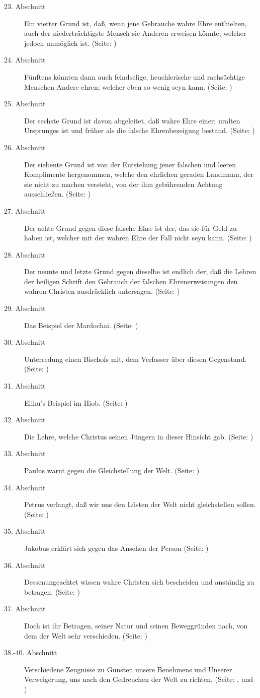 \begin{description}
\item[23. Abschnitt] Ein vierter Grund ist, daß, wenn jene Gebrauche wahre Ehre
enthielten, auch der niederträchtigste Mensch sie Anderen erweisen könnte;
welcher jedoch unmöglich ist. (Seite: \pageref{kap9_ab23})
\item[24. Abschnitt] Fünftens könnten dann auch feindselige, heuchlerische und
rachsüchtige Menschen Andere ehren; welcher eben so wenig seyn kann. (Seite: \pageref{kap9_ab24})
\item[25. Abschnitt] Der sechste Grund ist davon abgeleitet, daß wahre Ehre
einer; uralten Ursprunges ist und früher als die falsche Ehrenbezeigung bestand. (Seite: \pageref{kap9_ab25})
\item[26. Abschnitt] Der siebente Grund ist von der Entstehung jener falschen
und leeren Komplimente hergenommen, welche den ehrlichen geraden Landmann, der
sie nicht zu machen versteht, von der ihm gebührenden Achtung ausschließen. (Seite: \pageref{kap9_ab26})
\item[27. Abschnitt] Der achte Grund gegen diese falsche Ehre ist der, das sie
für Geld zu haben ist, welcher mit der wahren Ehre der Fall nicht seyn kann. (Seite: \pageref{kap9_ab27})
\item[28. Abschnitt] Der neunte und letzte Grund gegen dieselbe ist endlich der,
daß die Lehren der heiligen Schrift den Gebrauch der falschen Ehrenerweisungen
den wahren Christen ausdrücklich untersagen. (Seite: \pageref{kap9_ab28})
\item[29. Abschnitt] Das Beispiel der Mardochai. (Seite: \pageref{kap9_ab29})
\item[30. Abschnitt] Unterredung einen Bischofs mit, dem Verfasser über diesen
Gegenstand. (Seite: \pageref{kap9_ab30})
\item[31. Abschnitt] Elihu's Beispiel im Hiob. (Seite: \pageref{kap9_ab31})
\item[32. Abschnitt] Die Lehre, welche Christus seinen Jüngern in dieser
Hinsicht gab. (Seite: \pageref{kap9_ab32})
\item[33. Abschnitt] Paulus warnt gegen die Gleichstellung der Welt. (Seite: \pageref{kap9_ab33})
\item[34. Abschnitt] Petrus verlangt, daß wir uns den Lüsten der Welt nicht
gleichstellen sollen. (Seite: \pageref{kap9_ab34})
\item[35. Abschnitt] Jakobus erklärt sich gegen das Ansehen der Person (Seite: \pageref{kap9_ab35})
\item[36. Abschnitt] Dessenungeachtet wissen wahre Christen sich bescheiden und
anständig zu betragen. (Seite: \pageref{kap9_ab36})
\item[37. Abschnitt] Doch ist ihr Betragen, seiner Natur und seinen Beweggründen
nach, von dem der Welt sehr verschieden. (Seite: \pageref{kap9_ab37})
\item[38.-40. Abschnitt] Verschiedene Zeugnisse zu Gunsten unsere Benehmens und
Unserer Verweigerung, uns nach den Gedreuchen der Welt zu richten. (Seite: \pageref{kap9_ab38}, \pageref{kap9_ab39} und \pageref{kap9_ab40})

\end{description}
\normalsize

